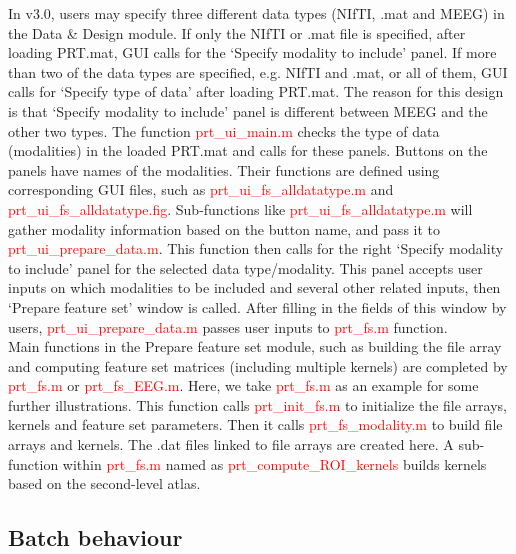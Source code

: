 In v3.0, users may specify three different data types (NIfTI, .mat and MEEG) in the Data \& Design module. If only the NIfTI or .mat file is specified, after loading PRT.mat, GUI calls for the ‘Specify modality to include’ panel. If more than two of the data types are specified, e.g. NIfTI and .mat, or all of them, GUI calls for ‘Specify type of data’ after loading PRT.mat. The reason for this design is that ‘Specify modality to include’ panel is different between MEEG and the other two types. The function \textcolor{red}{prt\_ui\_main.m} checks the type of data (modalities) in the loaded PRT.mat and calls for these panels. Buttons on the panels have names of the modalities. Their functions are defined using corresponding GUI files, such as \textcolor{red}{prt\_ui\_fs\_alldatatype.m} and \textcolor{red}{prt\_ui\_fs\_alldatatype.fig}. Sub-functions like \textcolor{red}{prt\_ui\_fs\_alldatatype.m} will gather modality information based on the button name, and pass it to \textcolor{red}{prt\_ui\_prepare\_data.m}. This function then calls for the right ‘Specify modality to include’ panel for the selected data type/modality. This panel accepts user inputs on which modalities to be included and several other related inputs, then ‘Prepare feature set’ window is called. After filling in the fields of this window by users, \textcolor{red}{prt\_ui\_prepare\_data.m} passes user inputs to \textcolor{red}{prt\_fs.m} function.
\\

Main functions in the Prepare feature set module, such as building the file array and computing feature set matrices (including multiple kernels) are completed by \textcolor{red}{prt\_fs.m} or \textcolor{red}{prt\_fs\_EEG.m}. Here, we take \textcolor{red}{prt\_fs.m} as an example for some further illustrations. This function calls \textcolor{red}{prt\_init\_fs.m} to initialize the file arrays, kernels and feature set parameters. Then it calls \textcolor{red}{prt\_fs\_modality.m} to build file arrays and kernels. The .dat files linked to file arrays are created here.  A sub-function within \textcolor{red}{prt\_fs.m} named as \textcolor{red}{prt\_compute\_ROI\_kernels} builds kernels based on the second-level atlas. 



\subsection{Batch behaviour}

